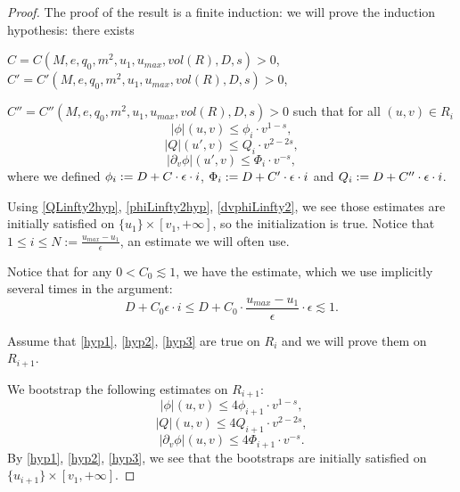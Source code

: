 \documentclass[10pt,a4paper]{article}
\theoremstyle{plain}
\theoremstyle{remark}
\theoremstyle{definition}
\theoremstyle{plain}
\theoremstyle{remark}
\theoremstyle{definition}
\newcommand{\uu}{u_{max}}
\numberwithin{equation}{section}
\begin{document}
\begin{proof}
	
	The proof of the result is a finite induction: we will prove the induction hypothesis: there exists 
	
	$C=C(M,e,q_0,m^2,u_1,\uu,vol(R),D,s)>0$, $C'=C'(M,e,q_0,m^2,u_1,\uu,vol(R),D,s)>0$,
	
	
	$C''=C''(M,e,q_0,m^2,u_1,\uu,vol(R),D,s)>0$ such that for all $(u,v) \in R_i$ \begin{equation} \label{hyp1}
	|\phi|(u,v) \leq \phi_i \cdot v^{1-s},
	\end{equation} 
	\begin{equation} \label{hyp2}
	|Q|(u',v) \leq  Q_i \cdot v^{2-2s},
	\end{equation}  \begin{equation} \label{hyp3}
	|\partial_v \phi|(u',v) \leq  \Phi_i \cdot v^{-s},
	\end{equation} where we defined $\phi_i:= D +C  \cdot \color{black}\epsilon \cdot i $, $\Phi_i:=  D +C'  \cdot \color{black}\epsilon \cdot i $ and $Q_i:= D +C''  \cdot \color{black} \epsilon \cdot i $.
	
	Using \eqref{QLinfty2hyp}, \eqref{phiLinfty2hyp}, \eqref{dvphiLinfty2}, we see those estimates are initially satisfied on $\{u_1\} \times [v_1,+\infty]$, so the initialization is true. Notice that $1 \leq i \leq N:=\frac{u_{max}-u_1}{\epsilon}$, an estimate we will often use.
	
	Notice that for any $0<C_0 \lesssim 1$, we have the estimate, which we use implicitly several times in the argument: $$ D+ C_0 \epsilon  \cdot i  \leq D+ C_0 \cdot  \frac{\uu-u_1}{\epsilon} \cdot  \epsilon  \lesssim 1.$$
	
	
	
	
	
	Assume that \eqref{hyp1}, \eqref{hyp2}, \eqref{hyp3} are true on $R_i$ and we will prove them on $R_{i+1}$.
	
	
	We bootstrap the following estimates on $R_{i+1}$: \begin{equation} \label{boostrap1}
	|\phi|(u,v) \leq 4 \phi_{i+1} \cdot  v^{1-s},
	\end{equation} \begin{equation} \label{boostrap2}
	|Q|(u,v) \leq 4 Q_{i+1} \cdot  v^{2-2s},
	\end{equation} \begin{equation} \label{boostrap3}
	|\partial_v \phi|(u,v) \leq 4 \Phi_{i+1} \cdot  v^{-s}.
	\end{equation} 
	By \eqref{hyp1}, \eqref{hyp2}, \eqref{hyp3}, we see that the bootstraps are initially satisfied on $\{u_{i+1}\} \times [v_1,+\infty]$.
	

\end{proof}
\end{document}
